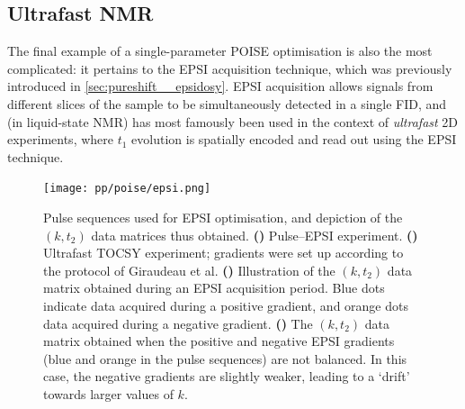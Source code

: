 \subsection{Ultrafast NMR}
\label{subsec:poise__epsi}

The final example of a single-parameter POISE optimisation is also the most complicated: it pertains to the EPSI acquisition technique, which was previously introduced in \cref{sec:pureshift__epsidosy}.
EPSI acquisition allows signals from different slices of the sample to be simultaneously detected in a single FID, and (in liquid-state NMR) has most famously been used in the context of \textit{ultrafast} 2D experiments\autocite{Frydman2002PNASUSA,Pelupessy2003JACS,Frydman2003JACS,Tal2010PNMRS,Giraudeau2014ARAC,Gouilleux2018ARNMRS,Kupce2021NRMP}, where $t_1$ evolution is spatially encoded and read out using the EPSI technique.

\begin{figure}[htb]
    \centering
    \texttt{[image: pp/poise/epsi.png]}%
    {\label{fig:poise_epsi_zgepsi}}%
    {\label{fig:poise_epsi_tocsyepsi}}%
    {\label{fig:poise_epsi_epsicorrect}}%
    {\label{fig:poise_epsi_epsiwrong}}%
    \caption[Pulse sequences used for EPSI optimisation]{
        Pulse sequences used for EPSI optimisation, and depiction of the $(k, t_2)$ data matrices thus obtained.
        \textbf{()} Pulse--EPSI experiment.
        \textbf{()} Ultrafast TOCSY experiment; gradients were set up according to the protocol of Giraudeau et al.\autocite{Gouilleux2018ARNMRS}
        \textbf{()} Illustration of the $(k, t_2)$ data matrix obtained during an EPSI acquisition period.
        Blue dots indicate data acquired during a positive gradient, and orange dots data acquired during a negative gradient.
        \textbf{()} The $(k, t_2)$ data matrix obtained when the positive and negative EPSI gradients (blue and orange in the pulse sequences) are not balanced.
        In this case, the negative gradients are slightly weaker, leading to a `drift' towards larger values of $k$.
    }
    \label{fig:poise_epsi}
\end{figure}

